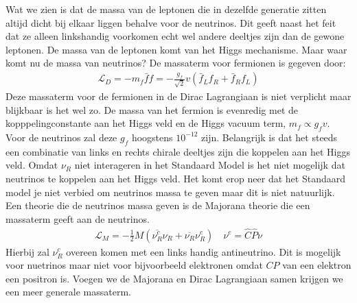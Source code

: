 \documentclass[../main.tex]{subfiles}
\begin{document}
Wat we zien is dat de massa van de leptonen die in dezelfde generatie zitten altijd dicht bij elkaar liggen behalve voor de neutrinos. Dit geeft naast het feit dat ze alleen linkshandig voorkomen echt wel andere deeltjes zijn dan de gewone leptonen. De massa van de leptonen komt van het Higgs mechanisme. Maar waar komt nu de massa van neutrinos? De massaterm voor fermionen is gegeven door:
\begin{equation}
    \begin{aligned}
        \label{eq:massaterm_fermionen}
        \mathcal{L}_{D}=-m_{f} \bar{f} f=-\frac{g_{f}}{\sqrt{2}} v\left(\bar{f}_{L} f_{R}+\bar{f}_{R} f_{L}\right)
    \end{aligned}
\end{equation}
Deze massaterm voor de fermionen in de Dirac Lagrangiaan is niet verplicht maar blijkbaar is het wel zo. De massa van het fermion is evenredig met de kopppelingconstante aan het Higgs veld en de Higgs vacuum term, $m_f\propto g_f v$. Voor de neutrinos zal deze $g_f$ hoogstens $10^{-12}$ zijn. Belangrijk is dat het steeds een combinatie van links en rechts chirale deeltjes zijn die koppelen aan het Higgs veld. Omdat $\nu_R$ niet interageren in het Standaard Model is het niet mogelijk dat neutrinos te koppelen aan het Higgs veld. Het komt erop neer dat het Standaard model je niet verbied om neutrinos massa te geven maar dit is niet natuurlijk. Een theorie die de neutrinos massa geven is de Majorana theorie die een massaterm geeft aan de neutrinos.
\begin{equation}
    \begin{aligned}
        \label{eq:majorana_massaterm}
        \mathcal{L}_{M}=-\frac{1}{2} M\left(\overline{\nu_{R}^{c}} \nu_{R}+\overline{\nu_{R}} \nu_{R}^{c}\right) \quad \nu^{c}=\hat{C} \hat{P}\nu
    \end{aligned}
\end{equation}
Hierbij zal $\nu_R^c$ overeen komen met een links handig antineutrino. Dit is mogelijk voor nuetrinos maar niet voor bijvoorbeeld elektronen omdat $CP$ van een elektron een positron is. Voegen we de Majorana en Dirac Lagrangiaan samen krijgen we een meer generale massaterm.
\end{document}
